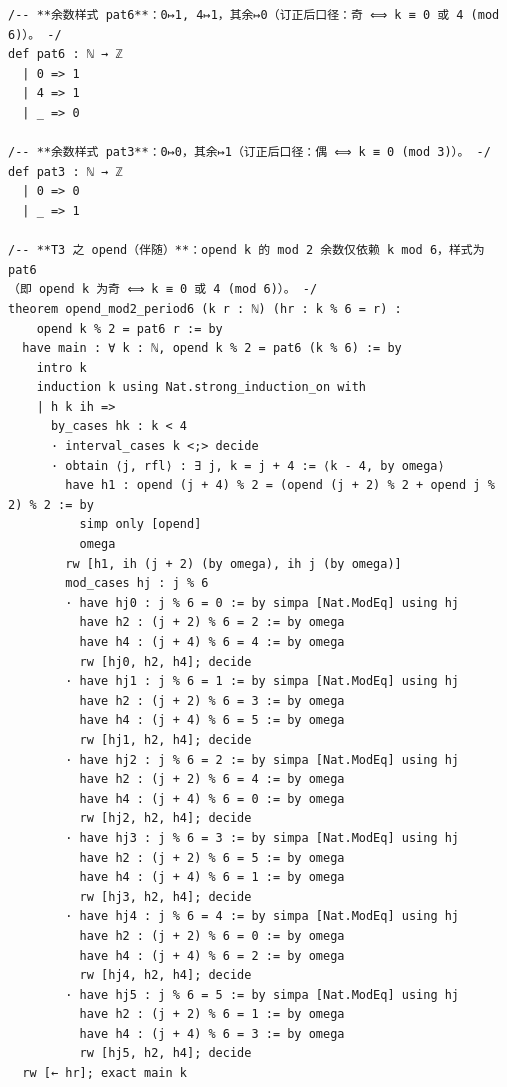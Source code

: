 \documentclass[11pt]{article}
\theoremstyle{definition}
\begin{document}
\begin{lstlisting}
/-- **余数样式 pat6**：0↦1, 4↦1，其余↦0（订正后口径：奇 ⟺ k ≡ 0 或 4 (mod 6)）。 -/
def pat6 : ℕ → ℤ
  | 0 => 1
  | 4 => 1
  | _ => 0

/-- **余数样式 pat3**：0↦0，其余↦1（订正后口径：偶 ⟺ k ≡ 0 (mod 3)）。 -/
def pat3 : ℕ → ℤ
  | 0 => 0
  | _ => 1

/-- **T3 之 opend（伴随）**：opend k 的 mod 2 余数仅依赖 k mod 6，样式为 pat6
（即 opend k 为奇 ⟺ k ≡ 0 或 4 (mod 6)）。 -/
theorem opend_mod2_period6 (k r : ℕ) (hr : k % 6 = r) :
    opend k % 2 = pat6 r := by
  have main : ∀ k : ℕ, opend k % 2 = pat6 (k % 6) := by
    intro k
    induction k using Nat.strong_induction_on with
    | h k ih =>
      by_cases hk : k < 4
      · interval_cases k <;> decide
      · obtain ⟨j, rfl⟩ : ∃ j, k = j + 4 := ⟨k - 4, by omega⟩
        have h1 : opend (j + 4) % 2 = (opend (j + 2) % 2 + opend j % 2) % 2 := by
          simp only [opend]
          omega
        rw [h1, ih (j + 2) (by omega), ih j (by omega)]
        mod_cases hj : j % 6
        · have hj0 : j % 6 = 0 := by simpa [Nat.ModEq] using hj
          have h2 : (j + 2) % 6 = 2 := by omega
          have h4 : (j + 4) % 6 = 4 := by omega
          rw [hj0, h2, h4]; decide
        · have hj1 : j % 6 = 1 := by simpa [Nat.ModEq] using hj
          have h2 : (j + 2) % 6 = 3 := by omega
          have h4 : (j + 4) % 6 = 5 := by omega
          rw [hj1, h2, h4]; decide
        · have hj2 : j % 6 = 2 := by simpa [Nat.ModEq] using hj
          have h2 : (j + 2) % 6 = 4 := by omega
          have h4 : (j + 4) % 6 = 0 := by omega
          rw [hj2, h2, h4]; decide
        · have hj3 : j % 6 = 3 := by simpa [Nat.ModEq] using hj
          have h2 : (j + 2) % 6 = 5 := by omega
          have h4 : (j + 4) % 6 = 1 := by omega
          rw [hj3, h2, h4]; decide
        · have hj4 : j % 6 = 4 := by simpa [Nat.ModEq] using hj
          have h2 : (j + 2) % 6 = 0 := by omega
          have h4 : (j + 4) % 6 = 2 := by omega
          rw [hj4, h2, h4]; decide
        · have hj5 : j % 6 = 5 := by simpa [Nat.ModEq] using hj
          have h2 : (j + 2) % 6 = 1 := by omega
          have h4 : (j + 4) % 6 = 3 := by omega
          rw [hj5, h2, h4]; decide
  rw [← hr]; exact main k


\end{lstlisting}
\end{document}
